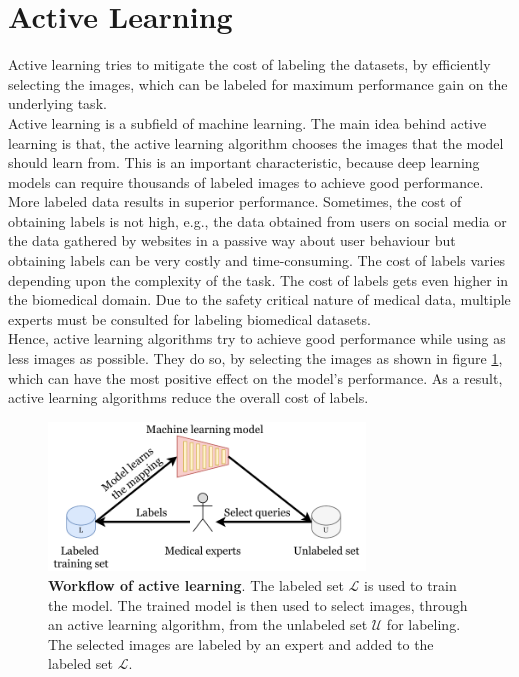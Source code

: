\section{Active Learning}
Active learning \cite{settles2009} tries to mitigate the cost of labeling the datasets, by efficiently selecting the images, which can be labeled for maximum performance gain on the underlying task. \\
Active learning is a subfield of machine learning. The main idea behind active learning is that, the active learning algorithm chooses the images that the model should learn from. This is an important characteristic, because deep learning models can require thousands of labeled images to achieve good performance. More labeled data results in superior performance. Sometimes, the cost of obtaining labels is not high, e.g., the data obtained from users on social media or the data gathered by websites in a passive way about user behaviour but obtaining labels can be very costly and time-consuming. The cost of labels varies depending upon the complexity of the task. The cost of labels gets even higher in the biomedical domain. Due to the safety critical nature of medical data, multiple experts must be consulted for labeling biomedical datasets. \\
Hence, active learning algorithms try to achieve good performance while using as less images as possible. They do so, by selecting the images as shown in figure \ref{fig:active_learning}, which can have the most positive effect on the model's performance. As a result, active learning algorithms reduce the overall cost of labels.

\begin{figure}[htbp]
\centering
\captionsetup{format=plain}
\includegraphics[width=0.75\textwidth]{figures/fig_active_learning.pdf}
\caption[Workflow of active learning]{\textbf{Workflow of active learning}. The labeled set $\mathcal{L}$ is used to train the model. The trained model is then used to select images, through an active learning algorithm, from the unlabeled set $\mathcal{U}$ for labeling. The selected images are labeled by an expert and added to the labeled set $\mathcal{L}$.}
\label{fig:active_learning}
\end{figure}

